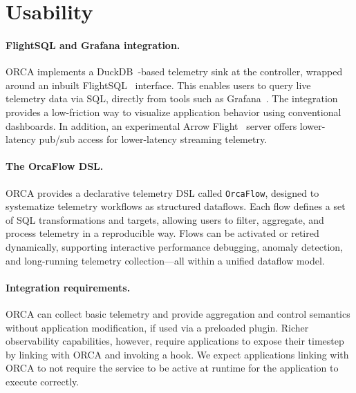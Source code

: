 \documentclass[ letterpaper, DIV=11, numbers=noendperiod]{scrartcl}
\begin{document}
%
\section{Usability}

\paragraph{FlightSQL and Grafana integration.} ORCA implements a DuckDB~\cite{Raasv2019:DuckDB}-based
telemetry sink at the controller, wrapped around an inbuilt FlightSQL~\cite{:ArrowFlightSQL}
interface. This enables users to query live telemetry data via SQL, directly
from tools such as Grafana~\cite{:GrafanaDashboard}. The integration provides a low-friction way to
visualize application behavior using conventional dashboards. In addition, an
experimental Arrow Flight~\cite{:ArrowFlight} server offers lower-latency pub/sub access for lower-latency streaming telemetry.

\paragraph{The OrcaFlow DSL.} ORCA provides a declarative telemetry DSL called
\texttt{OrcaFlow}, designed to systematize telemetry workflows as structured
dataflows. Each flow defines a set of SQL transformations and targets, allowing
users to filter, aggregate, and process telemetry in a reproducible way. Flows
can be activated or retired dynamically, supporting interactive
performance debugging, anomaly detection, and long-running telemetry
collection---all within a unified dataflow model.

\paragraph{Integration requirements.} ORCA can collect basic telemetry and provide
aggregation and control semantics without application modification, if used via a preloaded
plugin. Richer observability capabilities, however, require applications to expose their timestep
by linking with ORCA and invoking a hook. We expect applications linking with ORCA to not
require the service to be active at runtime for the application to execute correctly.
\end{document}
